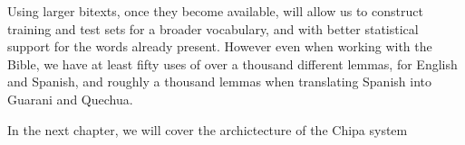 Using larger bitexts, once they become available, will allow us to construct
training and test sets for a broader vocabulary, and with better statistical
support for the words already present. However even when working with the Bible,
we have at least fifty uses of over a thousand different lemmas, for English and
Spanish, and roughly a thousand lemmas when translating Spanish into Guarani and
Quechua.

In the next chapter, we will cover the archictecture of the Chipa system
